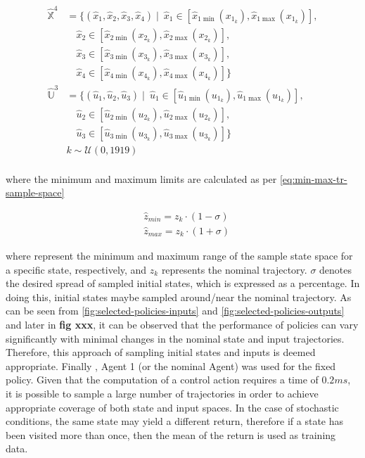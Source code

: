 \begin{equation}\label{eq:TR-sample-space}
\begin{split}
    \hat{\mathbb{X}}^4 &= \{ (\hat{x}_1, \hat{x}_2, \hat{x}_3, \hat{x}_4) \mid\ \hat{x}_1 \in [\hat{x}_{1\min}(x_{1_k}), \hat{x}_{1\max}(x_{1_k})], \\
    &\quad \hat{x}_2 \in [\hat{x}_{2\min}(x_{2_k}), \hat{x}_{2\max}(x_{2_k})], \\
    &\quad \hat{x}_3 \in [\hat{x}_{3\min}(x_{3_k}), \hat{x}_{3\max}(x_{3_k})], \\
    &\quad \hat{x}_4 \in [\hat{x}_{4\min}(x_{4_k}), \hat{x}_{4\max}(x_{4_k})] \} \\
    \hat{\mathbb{U}}^3 &= \{ (\hat{u}_1, \hat{u}_2, \hat{u}_3) \mid\ \hat{u}_1 \in [\hat{u}_{1\min}(u_{1_k}), \hat{u}_{1\max}(u_{1_k})], \\
    &\quad \hat{u}_2 \in [\hat{u}_{2\min}(u_{2_k}), \hat{u}_{2\max}(u_{2_k})], \\
    &\quad \hat{u}_3 \in [\hat{u}_{3\min}(u_{3_k}), \hat{u}_{3\max}(u_{3_k})] \} \\
    & k \sim \mathcal{U}(0,1919)  \\
\end{split}
\end{equation}

where the minimum and maximum limits are calculated as per \autoref{eq:min-max-tr-sample-space}

\begin{equation}\label{eq:min-max-tr-sample-space}
\begin{aligned}
    &\hat{z}_{min} = z_k \cdot (1-\sigma)\\
    &\hat{z}_{max} = z_k \cdot (1+\sigma)
\end{aligned}
\end{equation}

where represent the minimum and maximum range of the sample state space for a specific state, respectively, and ${z}_{k}$ represents the nominal trajectory. $\sigma$ denotes the desired spread of sampled initial states, which is expressed as a percentage.
In doing this, initial states maybe sampled around/near the nominal trajectory. As can be seen from \autoref{fig:selected-policies-inputs} and \autoref{fig:selected-policies-outputs} and later in \textbf{fig xxx}, it can be observed that the performance of policies can vary significantly with minimal changes in the nominal state and input trajectories. Therefore, this approach of sampling initial states and inputs is deemed appropriate. Finally , Agent 1 (or the nominal Agent) was used for the fixed policy. Given that the computation of a control action requires a time of $0.2 ms$, it is possible to sample a large number of trajectories in order to achieve appropriate coverage of both state and input spaces.
In the case of stochastic conditions, the same state may yield a different return, therefore if a state has been visited more than once, then the mean of the return is used as training data.

